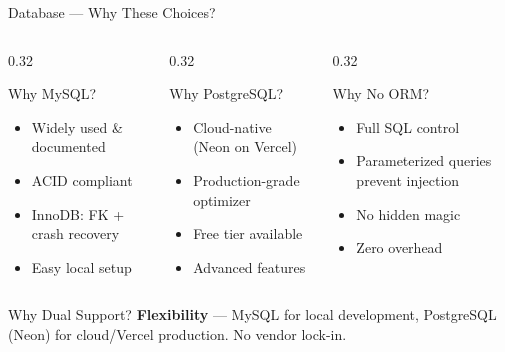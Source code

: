 \documentclass[aspectratio=169, 12pt]{beamer}
\begin{document}
\begin{frame}{Database --- Why These Choices?}

\begin{columns}[T]
\begin{column}{0.32\textwidth}
\begin{block}{Why MySQL?}
\begin{itemize}\itemsep=2pt
    \item Widely used \& documented
    \item ACID compliant
    \item InnoDB: FK + crash recovery
    \item Easy local setup
\end{itemize}
\end{block}
\end{column}
\begin{column}{0.32\textwidth}
\begin{block}{Why PostgreSQL?}
\begin{itemize}\itemsep=2pt
    \item Cloud-native (Neon on Vercel)
    \item Production-grade optimizer
    \item Free tier available
    \item Advanced features
\end{itemize}
\end{block}
\end{column}
\begin{column}{0.32\textwidth}
\begin{block}{Why No ORM?}
\begin{itemize}\itemsep=2pt
    \item Full SQL control
    \item Parameterized queries prevent injection
    \item No hidden magic
    \item Zero overhead
\end{itemize}
\end{block}
\end{column}
\end{columns}

\vspace{8pt}
\begin{exampleblock}{Why Dual Support?}
\textbf{Flexibility} --- MySQL for local development, PostgreSQL (Neon) for cloud/Vercel production. No vendor lock-in.
\end{exampleblock}
\end{frame}
\end{document}
